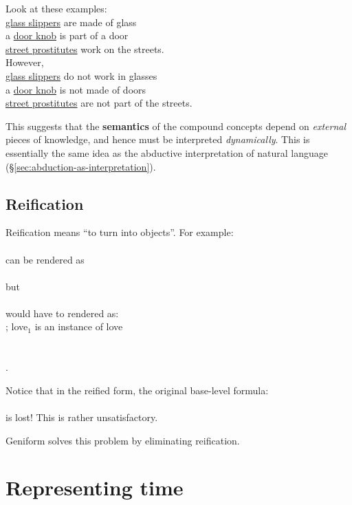 Look at these examples:\\
\tab \underline{glass slippers} are made of glass\\
\tab a \underline{door knob} is part of a door\\
\tab \underline{street prostitutes} work on the streets.\\
However,\\
\tab \underline{glass slippers} do not work in glasses\\
\tab a \underline{door knob} is not made of doors\\
\tab \underline{street prostitutes} are not part of the streets.

This suggests that the \textbf{semantics} of the compound concepts depend on \textit{external} pieces of knowledge, and hence must be interpreted \textit{dynamically}.  This is essentially the same idea as the abductive interpretation of natural language (\S\ref{sec:abduction-as-interpretation}).

\subsection{Reification}
\label{sec:reification}

Reification means ``to turn into objects''.  For example:\\
\tab {}\\
can be rendered as\\
\tab {}\\
but\\
\tab {}\\
would have to rendered as:\\
\tab {} \tab \tab ; love$_1$ is an instance of love\\
\tab {}\\
\tab {}\\
\tab {}.

Notice that in the reified form, the original base-level formula:\\
\tab {}\\
is lost!  This is rather unsatisfactory.

Geniform solves this problem by eliminating reification.

\section{Representing time}

